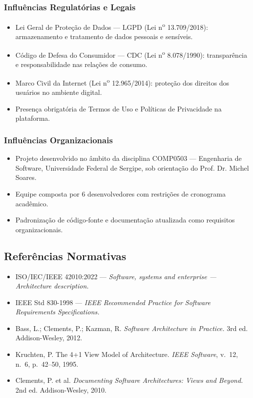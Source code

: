 ﻿\documentclass[12pt,a4paper]{article}
\begin{document}
\subsubsection{Influências Regulatórias e Legais}
\begin{itemize}[noitemsep]
    \item Lei Geral de Proteção de Dados --- LGPD (Lei n\textsuperscript{o} 13.709/2018): armazenamento e tratamento de dados pessoais e sensíveis.
    \item Código de Defesa do Consumidor --- CDC (Lei n\textsuperscript{o} 8.078/1990): transparência e responsabilidade nas relações de consumo.
    \item Marco Civil da Internet (Lei n\textsuperscript{o} 12.965/2014): proteção dos direitos dos usuários no ambiente digital.
    \item Presença obrigatória de Termos de Uso e Políticas de Privacidade na plataforma.
\end{itemize}

\subsubsection{Influências Organizacionais}
\begin{itemize}[noitemsep]
    \item Projeto desenvolvido no âmbito da disciplina COMP0503 --- Engenharia de Software, Universidade Federal de Sergipe, sob orientação do Prof. Dr. Michel Soares.
    \item Equipe composta por 6 desenvolvedores com restrições de cronograma acadêmico.
    \item Padronização de código-fonte e documentação atualizada como requisitos organizacionais.
\end{itemize}

\subsection{Referências Normativas}

\begin{itemize}[noitemsep]
    \item ISO/IEC/IEEE 42010:2022 --- \textit{Software, systems and enterprise --- Architecture description.}
    \item IEEE Std 830-1998 --- \textit{IEEE Recommended Practice for Software Requirements Specifications.}
    \item Bass, L.; Clements, P.; Kazman, R. \textit{Software Architecture in Practice.} 3rd ed. Addison-Wesley, 2012.
    \item Kruchten, P. The 4+1 View Model of Architecture. \textit{IEEE Software}, v.~12, n.~6, p.~42--50, 1995.
    \item Clements, P. et al. \textit{Documenting Software Architectures: Views and Beyond.} 2nd ed. Addison-Wesley, 2010.
\end{itemize}
\end{document}
